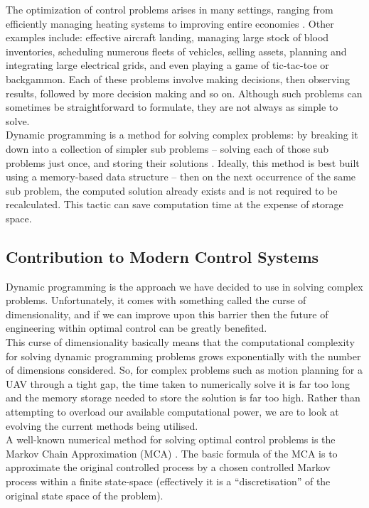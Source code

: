 \documentclass[11pt,draftd]{article}
\begin{document}
\noindent The optimization of control problems arises in many settings, ranging from efficiently managing heating systems to improving entire economies \cite{powell}. Other examples include: effective aircraft landing, managing large stock of blood inventories, scheduling numerous fleets of vehicles, selling assets, planning and integrating large electrical grids, and even playing a game of tic-tac-toe or backgammon. Each of these problems involve making decisions, then observing results, followed by more decision making and so on. Although such problems can sometimes be straightforward to formulate, they are not always as simple to solve. \\

\noindent Dynamic programming is a method for solving complex problems: by breaking it down into a collection of simpler sub problems – solving each of those sub problems just once, and storing their solutions \cite{wikiDyn}. Ideally, this method is best built using a memory-based data structure – then on the next occurrence of the same sub problem, the computed solution already exists and is not required to be recalculated. This tactic can save computation time at the expense of storage space. \\

\subsection{Contribution to Modern Control Systems}
\noindent Dynamic programming is the approach we have decided to use in solving complex problems. Unfortunately, it comes with something called the curse of dimensionality, and if we can improve upon this barrier then the future of engineering within optimal control can be greatly benefited. \\

\noindent This curse of dimensionality basically means that the computational complexity for solving dynamic programming problems grows exponentially with the number of dimensions considered. So, for complex problems such as motion planning for a UAV through a tight gap, the time taken to numerically solve it is far too long and the memory storage needed to store the solution is far too high. Rather than attempting to overload our available computational power, we are to look at evolving the current methods being utilised. \\

\noindent A well-known numerical method for solving optimal control problems is the Markov Chain Approximation (MCA) \cite{kushner}. The basic formula of the MCA is to approximate the original controlled process by a chosen controlled Markov process within a finite state-space (effectively it is a “discretisation” of the original state space of the problem). \\
\newpage
\end{document}
